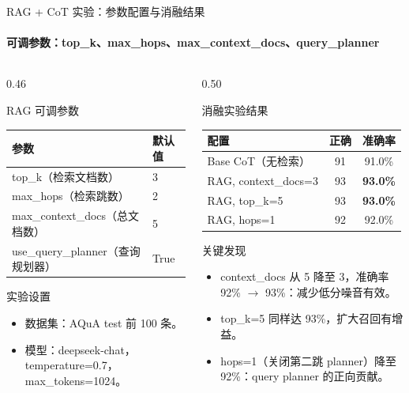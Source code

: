 \documentclass[10pt,aspectratio=169]{beamer}
\newcommand{\tightitems}{\setlength{\itemsep}{0.24em}}
\begin{document}
\begin{frame}{RAG + CoT 实验：参数配置与消融结果}
  \framesubtitle{可调参数：top\_k、max\_hops、max\_context\_docs、query\_planner}
  \small
  \begin{columns}[T,onlytextwidth]
    \begin{column}{0.46\textwidth}
      \begin{block}{RAG 可调参数}
        \begin{tabular}{ll}
          \toprule
          参数 & 默认值 \\
          \midrule
          top\_k（检索文档数） & 3 \\
          max\_hops（检索跳数） & 2 \\
          max\_context\_docs（总文档数） & 5 \\
          use\_query\_planner（查询规划器） & True \\
          \bottomrule
        \end{tabular}
      \end{block}
      \begin{block}{实验设置}
        \begin{itemize}
          \tightitems
          \item 数据集：AQuA test 前 100 条。
          \item 模型：deepseek-chat，temperature=0.7，max\_tokens=1024。
        \end{itemize}
      \end{block}
    \end{column}
    \begin{column}{0.50\textwidth}
      \begin{block}{消融实验结果}
        \begin{tabular}{lcc}
          \toprule
          配置 & 正确 & 准确率 \\
          \midrule
          Base CoT（无检索） & 91 & 91.0\% \\
          \midrule
          RAG, context\_docs=3 & 93 & \textbf{93.0\%} \\
          RAG, top\_k=5 & 93 & \textbf{93.0\%} \\
          RAG, hops=1 & 92 & 92.0\% \\
          \bottomrule
        \end{tabular}
      \end{block}
      \vspace{0.3em}
      \begin{alertblock}{关键发现}
        \begin{itemize}
          \tightitems
          \item context\_docs 从 5 降至 3，准确率 92\% $\to$ 93\%：减少低分噪音有效。
          \item top\_k=5 同样达 93\%，扩大召回有增益。
          \item hops=1（关闭第二跳 planner）降至 92\%：query planner 的正向贡献。
        \end{itemize}
      \end{alertblock}
    \end{column}
  \end{columns}
\end{frame}
\end{document}
